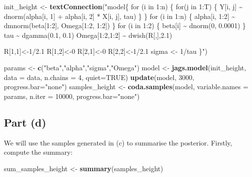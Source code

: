 \documentclass[
]{homework}
\newenvironment{Shaded}{\begin{snugshade}}{\end{snugshade}}
\newcommand{\AttributeTok}[1]{\textcolor[rgb]{0.13,0.29,0.53}{#1}}
\newcommand{\ConstantTok}[1]{\textcolor[rgb]{0.56,0.35,0.01}{#1}}
\newcommand{\DecValTok}[1]{\textcolor[rgb]{0.00,0.00,0.81}{#1}}
\newcommand{\FunctionTok}[1]{\textcolor[rgb]{0.13,0.29,0.53}{\textbf{#1}}}
\newcommand{\NormalTok}[1]{#1}
\newcommand{\OtherTok}[1]{\textcolor[rgb]{0.56,0.35,0.01}{#1}}
\newcommand{\StringTok}[1]{\textcolor[rgb]{0.31,0.60,0.02}{#1}}
\begin{document}
\begin{Shaded}
\begin{Highlighting}[]
\NormalTok{init\_height }\OtherTok{\textless{}{-}} \FunctionTok{textConnection}\NormalTok{(}\StringTok{"model\{}
\StringTok{  for (i in 1:n) \{}
\StringTok{    for(j in 1:T) \{}
\StringTok{      Y[i, j] \textasciitilde{} dnorm(alpha[i, 1] + alpha[i, 2] * X[i, j], tau)}
\StringTok{  \} \}}
\StringTok{    }
\StringTok{  for (i in 1:n) \{ alpha[i, 1:2] \textasciitilde{} dmnorm(beta[1:2], Omega[1:2, 1:2]) \}}
\StringTok{  }
\StringTok{  for (i in 1:2) \{ beta[i] \textasciitilde{} dnorm(0, 0.0001) \}}
\StringTok{  }
\StringTok{  tau \textasciitilde{} dgamma(0.1, 0.1)}
\StringTok{  }
\StringTok{  Omega[1:2,1:2] \textasciitilde{} dwish(R[,],2.1)}

\StringTok{  R[1,1]\textless{}{-}1/2.1}
\StringTok{  R[1,2]\textless{}{-}0}
\StringTok{  R[2,1]\textless{}{-}0}
\StringTok{  R[2,2]\textless{}{-}1/2.1}
\StringTok{  }
\StringTok{  sigma \textless{}{-} 1/tau}
\StringTok{\}"}\NormalTok{)}

\NormalTok{params  }\OtherTok{\textless{}{-}} \FunctionTok{c}\NormalTok{(}\StringTok{"beta"}\NormalTok{,}\StringTok{"alpha"}\NormalTok{,}\StringTok{"sigma"}\NormalTok{,}\StringTok{"Omega"}\NormalTok{)}
\NormalTok{model   }\OtherTok{\textless{}{-}} \FunctionTok{jags.model}\NormalTok{(init\_height, }\AttributeTok{data =}\NormalTok{ data, }\AttributeTok{n.chains =} \DecValTok{4}\NormalTok{, }\AttributeTok{quiet=}\ConstantTok{TRUE}\NormalTok{)}
\FunctionTok{update}\NormalTok{(model, }\DecValTok{3000}\NormalTok{, }\AttributeTok{progress.bar=}\StringTok{"none"}\NormalTok{)}
\NormalTok{samples\_height }\OtherTok{\textless{}{-}} \FunctionTok{coda.samples}\NormalTok{(model, }\AttributeTok{variable.names =}\NormalTok{ params, }\AttributeTok{n.iter =} \DecValTok{10000}\NormalTok{, }
                               \AttributeTok{progress.bar=}\StringTok{"none"}\NormalTok{)}
\end{Highlighting}
\end{Shaded}

\subsection{Part (d)}\label{part-d-2}

We will use the samples generated in (c) to summarise the posterior. Firstly, compute the
summary:

\begin{Shaded}
\begin{Highlighting}[]
\NormalTok{sum\_samples\_height }\OtherTok{\textless{}{-}} \FunctionTok{summary}\NormalTok{(samples\_height)}
\end{Highlighting}
\end{Shaded}
\end{document}
